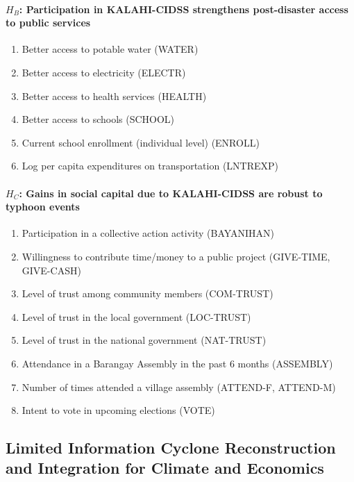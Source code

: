 \documentclass[12pt]{article}
\begin{document}
	\paragraph{$H_B$: Participation in KALAHI-CIDSS strengthens post-disaster access to public services}
		
		\begin{enumerate}
		\item Better access to potable water (WATER)
		\item Better access to electricity (ELECTR)
		\item Better access to health services (HEALTH)
		\item Better access to schools (SCHOOL)
		\item Current school enrollment (individual level) (ENROLL)
		\item Log per capita expenditures on transportation (LNTREXP)
		\end{enumerate}

	\paragraph{$H_C$: Gains in social capital due to KALAHI-CIDSS are robust to typhoon events}
	
	    \begin{enumerate}
		\item Participation in a collective action activity (BAYANIHAN)
		\item Willingness to contribute time/money to a public project (GIVE-TIME, GIVE-CASH)
		\item Level of trust among community members (COM-TRUST)
		\item Level of trust in the local government (LOC-TRUST)
		\item Level of trust in the national government (NAT-TRUST)
		\item Attendance in a Barangay Assembly in the past 6 months (ASSEMBLY)
		\item Number of times attended a village assembly (ATTEND-F, ATTEND-M)
		\item Intent to vote in upcoming elections (VOTE)
		\end{enumerate}

		
	\subsection{Limited Information Cyclone Reconstruction and Integration for Climate and Economics}
\end{document}
